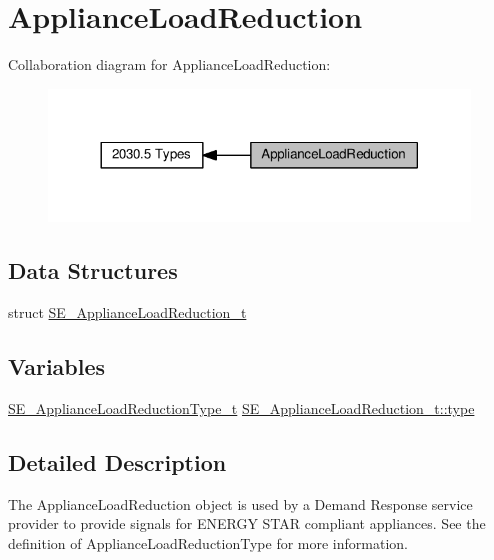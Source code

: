 \hypertarget{group__ApplianceLoadReduction}{}\section{Appliance\+Load\+Reduction}
\label{group__ApplianceLoadReduction}
Collaboration diagram for Appliance\+Load\+Reduction\+:\nopagebreak
\begin{figure}[H]
\begin{center}
\leavevmode
\includegraphics[width=317pt]{group__ApplianceLoadReduction}
\end{center}
\end{figure}
\subsection*{Data Structures}
\begin{DoxyCompactItemize}
\item 
struct \hyperlink{structSE__ApplianceLoadReduction__t}{S\+E\+\_\+\+Appliance\+Load\+Reduction\+\_\+t}
\end{DoxyCompactItemize}
\subsection*{Variables}
\begin{DoxyCompactItemize}
\item 
\hyperlink{group__ApplianceLoadReductionType_ga05e14b2c51c55d623a23c75b2ccae048}{S\+E\+\_\+\+Appliance\+Load\+Reduction\+Type\+\_\+t} \hyperlink{group__ApplianceLoadReduction_ga734164d895f698ed8bb14ed7abafba0b}{S\+E\+\_\+\+Appliance\+Load\+Reduction\+\_\+t\+::type}
\end{DoxyCompactItemize}


\subsection{Detailed Description}
The Appliance\+Load\+Reduction object is used by a Demand Response service provider to provide signals for E\+N\+E\+R\+GY S\+T\+AR compliant appliances. See the definition of Appliance\+Load\+Reduction\+Type for more information. 

